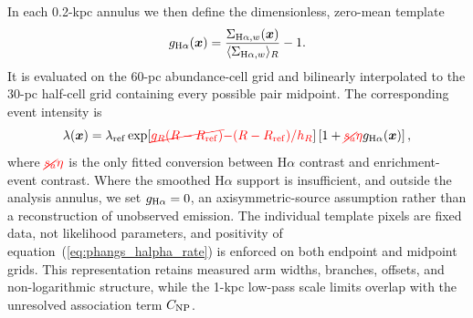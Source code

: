 \documentclass[fleqn,usenatbib]{mnras}
\newcommand{\bs}[1]{\boldsymbol{#1}}
\newcommand{\revaddmath}[1]{\textcolor{red}{#1}}
\newcommand{\revdelmath}[1]{\textcolor{red}{\cancel{#1}}}
\begin{document}
In each 0.2-kpc annulus we then define the dimensionless, zero-mean template
\begin{equation}
    g_{{\rm H}\alpha}(\bs{x})=
    \frac{\Sigma_{{\rm H}\alpha,w}(\bs{x})}
    {\langle\Sigma_{{\rm H}\alpha,w}\rangle_R}-1.
    \label{eq:phangs_halpha_template}
\end{equation}
It is evaluated on the 60-pc abundance-cell grid and bilinearly interpolated to the 30-pc half-cell grid containing every possible pair midpoint.  The corresponding event intensity is
\begin{equation}
    \lambda(\bs{x})=
    \lambda_{\rm ref}\exp[\revdelmath{g_R(R-R_{\rm ref})}\revaddmath{-(R-R_{\rm ref})/h_R}]
    \left[1+\revdelmath{s_a}\revaddmath{\eta} g_{{\rm H}\alpha}(\bs{x})\right],
    \label{eq:phangs_halpha_rate}
\end{equation}
where $\revdelmath{s_a}\revaddmath{\eta}$ is the only fitted conversion between H$\alpha$ contrast and enrichment-event contrast.  Where the smoothed H$\alpha$ support is insufficient, and outside the analysis annulus, we set $g_{{\rm H}\alpha}=0$, an axisymmetric-source assumption rather than a reconstruction of unobserved emission.  The individual template pixels are fixed data, not likelihood parameters, and positivity of equation~(\ref{eq:phangs_halpha_rate}) is enforced on both endpoint and midpoint grids.  This representation retains measured arm widths, branches, offsets, and non-logarithmic structure, while the 1-kpc low-pass scale limits overlap with the unresolved association term $C_{\rm NP}$.
\end{document}
